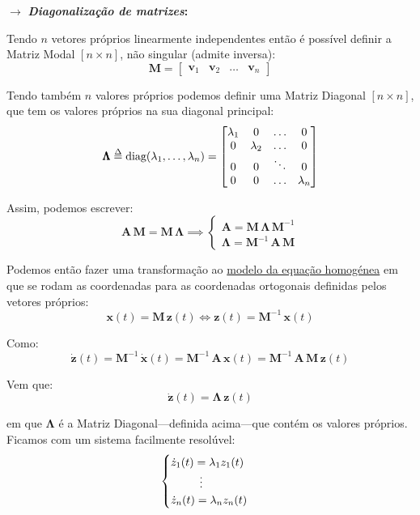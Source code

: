 {

\begin{mdframed}
    \noindent $\pmb{\rightarrow}$ \textbf{\textit{Diagonalização de matrizes}:}

    \noindent Tendo $n$ vetores próprios linearmente independentes então é possível definir a Matriz Modal $[n \times n]$, não singular (admite inversa):
    $$
        \pmb{M} = 
        \begin{bmatrix}
                \pmb{v}_1 & \pmb{v}_2 & \dots & \pmb{v}_n
        \end{bmatrix}
    $$

    \noindent Tendo também $n$ valores próprios podemos definir uma Matriz Diagonal $[n \times n]$, que tem os valores próprios na sua diagonal principal:
    $$
        \pmb{\Lambda} \delequal \text{diag}(\lambda_1,\dots,\lambda_n) = 
        \begin{bmatrix}
                \lambda_1 & 0 & \dots & 0 \\
                0 & \lambda_2 & \dots & 0 \\
                0 & 0 & \ddots & 0 \\
                0 & 0 & \dots & \lambda_n 
        \end{bmatrix}
    $$

    \noindent Assim, podemos escrever:
    $$
        \pmb{A}\, \pmb{M} = \pmb{M}\,\pmb{\Lambda} \implies
        \begin{cases}
            \pmb{A} = \pmb{M}\, \pmb{\Lambda}\, \pmb{M}^{-1}\\
            \pmb{\Lambda} = \pmb{M}^{-1}\, \pmb{A}\, \pmb{M}
        \end{cases}
    $$
\end{mdframed}
}

\noindent Podemos então fazer uma transformação ao \underline{modelo da equação homogénea} em que se rodam as coordenadas para as coordenadas ortogonais definidas pelos vetores próprios:
$$
    \pmb{x}(t) = \pmb{M}\, \pmb{z}(t) \iff \pmb{z}(t) = \pmb{M}^{-1}\,\pmb{x}(t)
$$

\noindent Como:
$$
    \pmb{\dot{z}}(t) = \pmb{M}^{-1}\,\pmb{\dot{x}}(t) = \pmb{M}^{-1}\,\pmb{A}\,\pmb{x}(t) = \pmb{M}^{-1}\,\pmb{A}\,\pmb{M}\, \pmb{z}(t)
$$

\noindent Vem que:
$$
    \pmb{\dot{z}}(t) = \pmb{\Lambda}\, \pmb{z}(t)
$$

\noindent em que $\pmb{\Lambda}$ é a Matriz Diagonal---definida acima---que contém os valores próprios.
\\[6pt]
\noindent Ficamos com um sistema facilmente resolúvel:
$$
    \begin{cases}
        \dot{z}_1(t) = \lambda_1 z_1(t)\\
        \mkern46mu \vdots\\
        \dot{z}_n(t) = \lambda_n z_n(t)
    \end{cases}
$$

